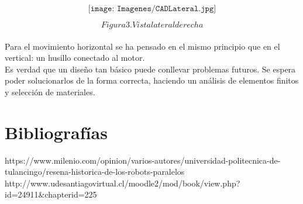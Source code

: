 \documentclass[12pt,a4paper]{report}
\begin{document}
$$\texttt{[image: Imagenes/CADLateral.jpg]}$$

$$Figura 3. Vista lateral derecha$$\\

Para el movimiento horizontal se ha pensado en el mismo principio que en el vertical: un husillo conectado al motor. \\

Es verdad que un diseño tan básico puede conllevar problemas futuros. Se espera poder solucionarlos de la forma correcta, haciendo un análisis de elementos finitos y selección de materiales.

\section*{Bibliografías}
https://www.milenio.com/opinion/varios-autores/universidad-politecnica-de-tulancingo/resena-historica-de-los-robots-paralelos\\
http://www.udesantiagovirtual.cl/moodle2/mod/book/view.php?id=24911&chapterid=225
\end{document}
